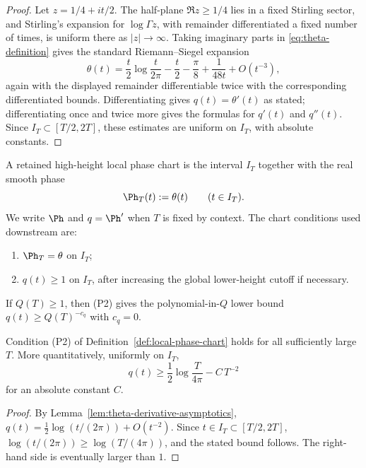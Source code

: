 \begin{proof}
Let \(z=1/4+it/2\).  The half-plane \(\Re z\ge 1/4\) lies in a fixed
Stirling sector, and Stirling's expansion for \(\log\Gamma z\), with
remainder differentiated a fixed number of times, is uniform there as
\(|z|\to\infty\).  Taking imaginary parts in \eqref{eq:theta-definition}
gives the standard Riemann--Siegel expansion
\[
\theta(t)=\frac{t}{2}\log\frac{t}{2\pi}-\frac{t}{2}-\frac{\pi}{8}
          +\frac{1}{48 t}+O(t^{-3}),
\]
again with the displayed remainder differentiable twice with the
corresponding differentiated bounds.  Differentiating gives
\(q(t)=\theta'(t)\) as stated; differentiating once and twice more gives
the formulas for \(q'(t)\) and \(q''(t)\).  Since
\(I_T\subset[T/2,2T]\), these estimates are uniform on \(I_T\), with
absolute constants.
\end{proof}

\begin{definition}
\label{def:local-phase-chart}
A retained high-height local phase chart is the interval \(I_T\)
together with the real smooth phase
\[
        \Ph_T(t):=\theta(t)\qquad (t\in I_T).
\]
We write \(\Ph\) and \(q=\Ph'\) when \(T\) is fixed by context.  The
chart conditions used downstream are:
\begin{enumerate}[label=\textup{(P\arabic*)},leftmargin=*]
\item \(\Ph_T = \theta\) on \(I_T\);
\item \(q(t)\ge 1\) on \(I_T\), after increasing the global lower-height
      cutoff if necessary.
\end{enumerate}
If \(Q(T)\ge 1\), then (P2) gives the polynomial-in-\(Q\) lower bound
\(q(t)\ge Q(T)^{-c_q}\) with \(c_q = 0\).
\end{definition}

\begin{lemma}
\label{lem:phase-derivative-lower-bound}
Condition \textup{(P2)} of Definition~\ref{def:local-phase-chart}
holds for all sufficiently large \(T\).  More quantitatively, uniformly
on \(I_T\),
\[
        q(t)\ge \frac12\log\frac{T}{4\pi}-C\,T^{-2}
\]
for an absolute constant \(C\).
\end{lemma}

\begin{proof}
By Lemma~\ref{lem:theta-derivative-asymptotics},
\(q(t)=\tfrac12\log(t/(2\pi))+O(t^{-2})\).  Since
\(t \in I_T \subset [T/2, 2T]\),
\(\log(t/(2\pi)) \ge \log(T/(4\pi))\), and the stated bound follows.
The right-hand side is eventually larger than \(1\).
\end{proof}

